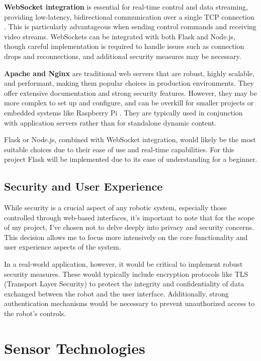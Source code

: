 \textbf{WebSocket integration} is essential for real-time control and data streaming, providing low-latency, bidirectional communication over a single TCP connection \cite{websockets}. This is particularly advantageous when sending control commands and receiving video streams. WebSockets can be integrated with both Flask and Node.js, though careful implementation is required to handle issues such as connection drops and reconnections, and additional security measures may be necessary.

\textbf{Apache and Nginx} are traditional web servers that are robust, highly scalable, and performant, making them popular choices in production environments. They offer extensive documentation and strong security features. However, they may be more complex to set up and configure, and can be overkill for smaller projects or embedded systems like Raspberry Pi \cite{jankov2019}. They are typically used in conjunction with application servers rather than for standalone dynamic content.

Flask or Node.js, combined with WebSocket integration, would likely be the most suitable choices due to their ease of use and real-time capabilities. For this project Flask will be implemented due to its ease of understanding for a beginner.

\subsection{Security and User Experience}

While security is a crucial aspect of any robotic system, especially those controlled through web-based interfaces, it's important to note that for the scope of my project, I've chosen not to delve deeply into privacy and security concerns. This decision allows me to focus more intensively on the core functionality and user experience aspects of the system.

In a real-world application, however, it would be critical to implement robust security measures. These would typically include encryption protocols like TLS (Transport Layer Security) to protect the integrity and confidentiality of data exchanged between the robot and the user interface. Additionally, strong authentication mechanisms would be necessary to prevent unauthorized access to the robot's controls.

\section{Sensor Technologies}

